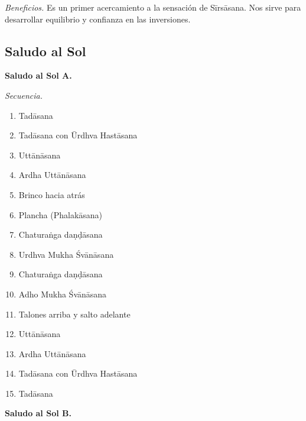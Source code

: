 \emph{Beneficios.} Es un primer acercamiento
a la sensación de Sīrsāsana. Nos sirve para
desarrollar equilibrio y confianza en las
inversiones.

\subsection{Saludo al Sol}
\label{section-saludo-al-sol}

\medskip\noindent\textbf{Saludo al Sol A.}

\emph{Secuencia.}
\begin{enumerate}
\item Tadāsana
\item Tadāsana con Ūrdhva Hastāsana
\item Uttānāsana
\item Ardha Uttānāsana
\item Brinco hacia atrás
\item Plancha (Phalakāsana)
\item Chaturaṅga daṇḍāsana
\item Urdhva Mukha Śvānāsana
\item Chaturaṅga daṇḍāsana
\item Adho Mukha Śvānāsana
\item Talones arriba y salto adelante
\item Uttānāsana
\item Ardha Uttānāsana
\item Tadāsana con Ūrdhva Hastāsana
\item Tadāsana
\end{enumerate}

\medskip\noindent\textbf{Saludo al Sol B.}

